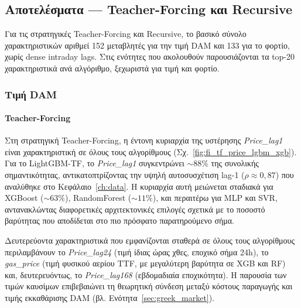 \subsection{Αποτελέσματα --- Teacher-Forcing και Recursive}
\label{sec:fi_tf_rec}

Για τις στρατηγικές Teacher-Forcing και Recursive, το βασικό σύνολο
χαρακτηριστικών αριθμεί 152 μεταβλητές για την τιμή DAM και 133 για το φορτίο,
χωρίς dense intraday lags. Στις ενότητες που ακολουθούν παρουσιάζονται τα top-20
χαρακτηριστικά ανά αλγόριθμο, ξεχωριστά για τιμή και φορτίο.

\subsubsection{Τιμή DAM}
\label{sec:fi_tf_rec_price}

\paragraph*{Teacher-Forcing}

Στη στρατηγική Teacher-Forcing, η έντονη κυριαρχία της υστέρησης
\textit{Price\_lag1} είναι χαρακτηριστική σε όλους τους αλγορίθμους
(Σχ.~\ref{fig:fi_tf_price_lgbm_xgb}).
Για το LightGBM-TF, το \textit{Price\_lag1} συγκεντρώνει ${\sim}88\%$ της
συνολικής σημαντικότητας, αντικατοπτρίζοντας την υψηλή αυτοσυσχέτιση lag-1
($\rho \approx 0{,}87$) που αναλύθηκε στο Κεφάλαιο~\ref{ch:data}. Η κυριαρχία
αυτή μειώνεται σταδιακά για XGBoost (${\sim}63\%$), RandomForest (${\sim}11\%$),
και περαιτέρω για MLP και SVR, αντανακλώντας διαφορετικές αρχιτεκτονικές επιλογές
σχετικά με το ποσοστό βαρύτητας που αποδίδεται στο πιο πρόσφατο παρατηρούμενο
σήμα.

Δευτερεύοντα χαρακτηριστικά που εμφανίζονται σταθερά σε όλους τους αλγορίθμους
περιλαμβάνουν το \textit{Price\_lag24} (τιμή ίδιας ώρας χθες, εποχικό σήμα 24h),
το \textit{gas\_price} (τιμή φυσικού αερίου TTF, με μεγαλύτερη βαρύτητα σε XGB
και RF) και, δευτερευόντως, το \textit{Price\_lag168} (εβδομαδιαία εποχικότητα).
Η παρουσία των τιμών καυσίμων επιβεβαιώνει τη θεωρητική σύνδεση μεταξύ κόστους
παραγωγής και τιμής εκκαθάρισης DAM (βλ. Ενότητα~\ref{sec:greek_market}).

